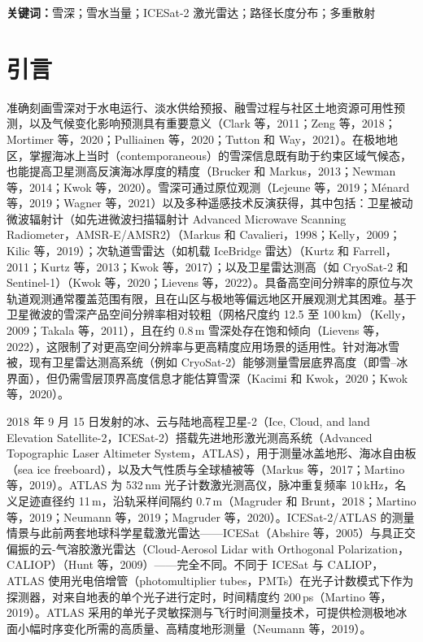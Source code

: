 \noindent\textbf{关键词：}雪深；雪水当量；ICESat-2 激光雷达；路径长度分布；多重散射

\section{引言}
准确刻画雪深对于水电运行、淡水供给预报、融雪过程与社区土地资源可用性预测，以及气候变化影响预测具有重要意义（Clark 等，2011；Zeng 等，2018；Mortimer 等，2020；Pulliainen 等，2020；Tutton 和 Way，2021）。在极地地区，掌握海冰上当时（contemporaneous）的雪深信息既有助于约束区域气候态，也能提高卫星测高反演海冰厚度的精度（Brucker 和 Markus，2013；Newman 等，2014；Kwok 等，2020）。雪深可通过原位观测（Lejeune 等，2019；Ménard 等，2019；Wagner 等，2021）以及多种遥感技术反演获得，其中包括：卫星被动微波辐射计（如先进微波扫描辐射计 Advanced Microwave Scanning Radiometer，AMSR-E/AMSR2）（Markus 和 Cavalieri，1998；Kelly，2009；Kilic 等，2019）；次轨道雪雷达（如机载 IceBridge 雷达）（Kurtz 和 Farrell，2011；Kurtz 等，2013；Kwok 等，2017）；以及卫星雷达测高（如 CryoSat-2 和 Sentinel-1）（Kwok 等，2020；Lievens 等，2022）。具备高空间分辨率的原位与次轨道观测通常覆盖范围有限，且在山区与极地等偏远地区开展观测尤其困难。基于卫星微波的雪深产品空间分辨率相对较粗（网格尺度约 12.5 至 100\,km）（Kelly，2009；Takala 等，2011），且在约 0.8\,m 雪深处存在饱和倾向（Lievens 等，2022），这限制了对更高空间分辨率与更高精度应用场景的适用性。针对海冰雪被，现有卫星雷达测高系统（例如 CryoSat-2）能够测量雪层底界高度（即雪--冰界面），但仍需雪层顶界高度信息才能估算雪深（Kacimi 和 Kwok，2020；Kwok 等，2020）。

2018 年 9 月 15 日发射的冰、云与陆地高程卫星-2（Ice, Cloud, and land Elevation Satellite-2，ICESat-2）搭载先进地形激光测高系统（Advanced Topographic Laser Altimeter System，ATLAS），用于测量冰盖地形、海冰自由板（sea ice freeboard），以及大气性质与全球植被等（Markus 等，2017；Martino 等，2019）。ATLAS 为 532\,nm 光子计数激光测高仪，脉冲重复频率 10\,kHz，名义足迹直径约 11\,m，沿轨采样间隔约 0.7\,m（Magruder 和 Brunt，2018；Martino 等，2019；Neumann 等，2019；Magruder 等，2020）。ICESat-2/ATLAS 的测量情景与此前两套地球科学星载激光雷达——ICESat（Abshire 等，2005）与具正交偏振的云-气溶胶激光雷达（Cloud-Aerosol Lidar with Orthogonal Polarization，CALIOP）（Hunt 等，2009）——完全不同。不同于 ICESat 与 CALIOP，ATLAS 使用光电倍增管（photomultiplier tubes，PMTs）在光子计数模式下作为探测器，对来自地表的单个光子进行定时，时间精度约 200\,ps（Martino 等，2019）。ATLAS 采用的单光子灵敏探测与飞行时间测量技术，可提供检测极地冰面小幅时序变化所需的高质量、高精度地形测量（Neumann 等，2019）。

